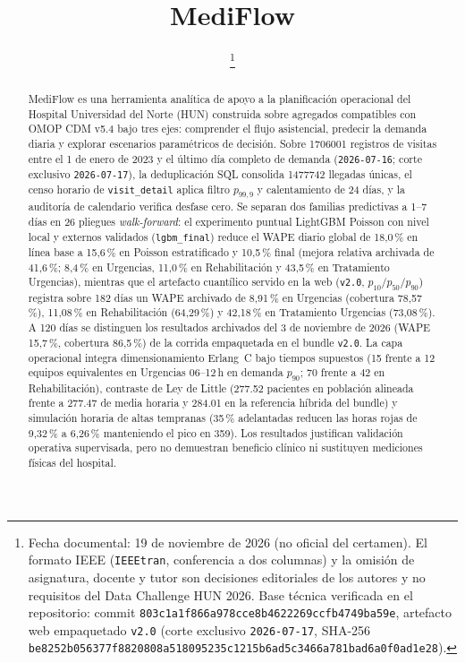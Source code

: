 \documentclass[conference,letterpaper]{IEEEtran}
\begin{document}
\title{MediFlow}

\author{%
  \thanks{Fecha documental: 19 de noviembre de 2026 (no oficial del certamen). El formato IEEE (\texttt{IEEEtran}, conferencia a dos columnas) y la omisión de asignatura, docente y tutor son decisiones editoriales de los autores y no requisitos del Data Challenge HUN 2026. Base técnica verificada en el repositorio: commit \nolinkurl{803c1a1f866a978cce8b4622269ccfb4749ba59e}, artefacto web empaquetado \texttt{v2.0} (corte exclusivo \texttt{2026-07-17}, SHA-256 \nolinkurl{be8252b056377f8820808a518095235c}\allowbreak\nolinkurl{1215b6ad5c3466a781bad6a0f0ad1e28}).}%
}

\maketitle

\begin{abstract}
MediFlow es una herramienta analítica de apoyo a la planificación operacional del Hospital Universidad del Norte (HUN) construida sobre agregados compatibles con OMOP CDM v5.4 bajo tres ejes: comprender el flujo asistencial, predecir la demanda diaria y explorar escenarios paramétricos de decisión. Sobre \num{1706001} registros de visitas entre el 1 de enero de 2023 y el último día completo de demanda (\texttt{2026-07-16}; corte exclusivo \texttt{2026-07-17}), la deduplicación SQL consolida \num{1477742} llegadas únicas, el censo horario de \texttt{visit\_detail} aplica filtro $p_{99{,}9}$ y calentamiento de 24 días, y la auditoría de calendario verifica desfase cero. Se separan dos familias predictivas a 1--7 días en 26 pliegues \textit{walk-forward}: el experimento puntual LightGBM Poisson con nivel local y externos validados (\texttt{lgbm\_final}) reduce el WAPE diario global de 18,0\,\% en línea base a 15,6\,\% en Poisson estratificado y 10,5\,\% final (mejora relativa archivada de 41,6\,\%; 8,4\,\% en Urgencias, 11,0\,\% en Rehabilitación y 43,5\,\% en Tratamiento Urgencias), mientras que el artefacto cuantílico servido en la web (\texttt{v2.0}, $p_{10}/p_{50}/p_{90}$) registra sobre 182 días un WAPE archivado de 8,91\,\% en Urgencias (cobertura 78,57\,\%), 11,08\,\% en Rehabilitación (64,29\,\%) y 42,18\,\% en Tratamiento Urgencias (73,08\,\%). A 120 días se distinguen los resultados archivados del 3 de noviembre de 2026 (WAPE 15,7\,\%, cobertura 86,5\,\%) de la corrida empaquetada en el bundle \texttt{v2.0}. La capa operacional integra dimensionamiento Erlang~C bajo tiempos supuestos (15 frente a 12 equipos equivalentes en Urgencias 06--12\,h en demanda $p_{90}$; 70 frente a 42 en Rehabilitación), contraste de Ley de Little (\num{277,52} pacientes en población alineada frente a \num{277,47} de media horaria y \num{284,01} en la referencia híbrida del bundle) y simulación horaria de altas tempranas (35\,\% adelantadas reducen las horas rojas de 9,32\,\% a 6,26\,\% manteniendo el pico en 359). Los resultados justifican validación operativa supervisada, pero no demuestran beneficio clínico ni sustituyen mediciones físicas del hospital.
\end{abstract}
\end{document}
